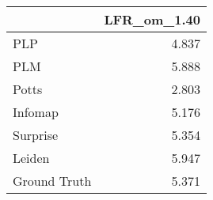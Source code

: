 \begin{tabular}{lr}
\toprule
{} & LFR_om_1.40 \\
\midrule
PLP          &       4.837 \\
PLM          &       5.888 \\
Potts        &       2.803 \\
Infomap      &       5.176 \\
Surprise     &       5.354 \\
Leiden       &       5.947 \\
Ground Truth &       5.371 \\
\bottomrule
\end{tabular}
